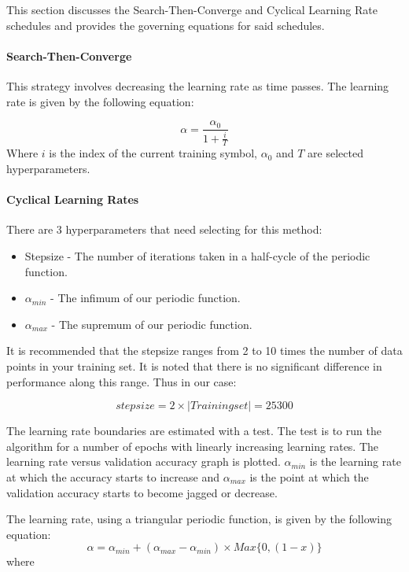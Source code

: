 \documentclass{article}
\begin{document}
This section discusses the Search-Then-Converge and Cyclical Learning Rate schedules and provides the governing equations for said schedules.


\paragraph{Search-Then-Converge}
This strategy involves decreasing the learning rate as time passes. The learning rate is given by the following equation:

\begin{equation}
	\alpha = \frac{\alpha_0}{1 + \frac{i}{T}}
\end{equation}
Where $i$ is the index of the current training symbol, $\alpha_0$ and $T$ are selected hyperparameters.
\paragraph{Cyclical Learning Rates}
There are 3 hyperparameters that need selecting for this method:
\begin{itemize}
	\item Stepsize - The number of iterations taken in a half-cycle of the periodic function.
	\item $\alpha_{min}$ - The infimum of our periodic function.
	\item $\alpha_{max}$ - The supremum of our periodic function.
\end{itemize}

It is recommended that the stepsize ranges from 2 to 10 times the number of data points in your training set. It is noted that there is no significant difference in performance along this range.
Thus in our case:

\begin{equation}
stepsize = 2 \times |Training set| = 25300
\end{equation}

The learning rate boundaries are estimated with a test. The test is to run the algorithm for a number of epochs with linearly increasing learning rates. The learning rate versus validation accuracy graph is plotted. $\alpha_{min}$ is the learning rate at which the accuracy starts to increase and $\alpha_{max}$ is the point at which the validation accuracy starts to become jagged or decrease.

The learning rate, using a triangular periodic function, is given by the following equation:
\begin{equation}
	\alpha = \alpha_{min} + (\alpha_{max} - \alpha_{min})\times Max\{0, (1-x)\}
\end{equation}
where 
\end{document}
